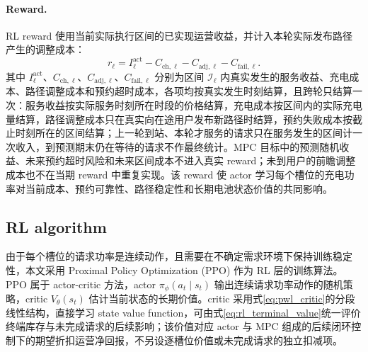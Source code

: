 \documentclass[12pt,a4paper,UTF8]{ctexart}
\begin{document}
\paragraph{Reward.}
RL reward 使用当前实际执行区间的已实现运营收益，并计入本轮实际发布路径产生的调整成本：
\begin{equation}
r_\ell
=
I_\ell^{\mathrm{act}}
-C_{\mathrm{ch},\ell}
-C_{\mathrm{adj},\ell}
-C_{\mathrm{fail},\ell}.
\label{eq:rl_reward}
\end{equation}
其中 $I_\ell^{\mathrm{act}}$、$C_{\mathrm{ch},\ell}$、$C_{\mathrm{adj},\ell}$、$C_{\mathrm{fail},\ell}$ 分别为区间 $\mathcal I_\ell$ 内真实发生的服务收益、充电成本、路径调整成本和预约超时成本，各项均按真实发生时刻结算，且跨轮只结算一次：服务收益按实际服务时刻所在时段的价格结算，充电成本按区间内的实际充电量结算，路径调整成本只在真实向在途用户发布新路径时结算，预约失败成本按截止时刻所在的区间结算；上一轮到站、本轮才服务的请求只在服务发生的区间计一次收入，到预测期末仍在等待的请求不作最终统计。MPC 目标中的预测随机收益、未来预约超时风险和未来区间成本不进入真实 reward；未到用户的前瞻调整成本也不在当期 reward 中重复实现。该 reward 使 actor 学习每个槽位的充电功率对当前成本、预约可靠性、路径稳定性和长期电池状态价值的共同影响。


\subsection{RL algorithm}

由于每个槽位的请求功率是连续动作，且需要在不确定需求环境下保持训练稳定性，本文采用 Proximal Policy Optimization (PPO) 作为 RL 层的训练算法。PPO 属于 actor-critic 方法，actor $\pi_{\phi}(a_t\mid s_t)$ 输出连续请求功率动作的随机策略，critic $V_{\theta}(s_t)$ 估计当前状态的长期价值。critic 采用式\eqref{eq:pwl_critic}的分段线性结构，直接学习 state value function，可由式\eqref{eq:rl_terminal_value}统一评价终端库存与未完成请求的后续影响；该价值对应 actor 与 MPC 组成的后续闭环控制下的期望折扣运营净回报，不另设逐槽位价值或未完成请求的独立扣减项。
\end{document}
